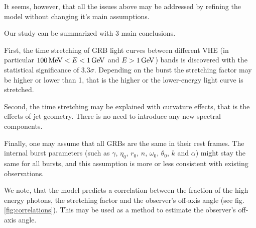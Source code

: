 \documentclass[manuscript]{aastex}
\begin{document}
It seems, however, that all the issues above may be addressed by
refining the model without changing it's main assumptions.

Our study can be summarized with 3 main conclusions.

First, the time stretching of GRB light curves between different VHE
(in particular $\unit[100]{MeV} < E < \unit[1]{GeV}$ and $E >
\unit[1]{GeV}$) bands is discovered with the statistical significance
of $3.3\sigma$.  Depending on the burst the stretching factor may be
higher or lower than 1, that is the higher or the lower-energy light
curve is stretched.

Second, the time stretching may be explained with curvature effects,
that is the effects of jet geometry.  There is no need to introduce
any new spectral components.

Finally, one may assume that all GRBs are the same in their rest
frames.  The internal burst parameters (such as $\gamma$, $\eta_0$,
$r_0$, $n$, $\omega_0$, $\theta_0$, $k$ and $\alpha$) might stay the
same for all bursts, and this assumption is more or less consistent
with existing observations.

We note, that the model predicts a correlation between
the fraction of the high energy photons, the stretching factor and the
observer's off-axis angle (see fig. \ref{fig:correlations}). This may
be used as a method to estimate the observer's off-axis angle.
\end{document}
